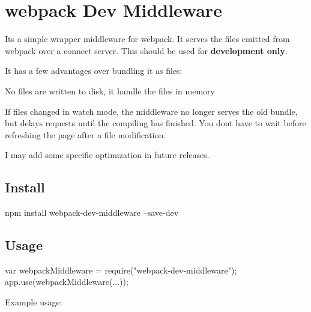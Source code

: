 \href{https://npmjs.com/package/webpack-dev-middleware}{\tt } \href{https://nodejs.org}{\tt } \href{https://david-dm.org/webpack/webpack-dev-middleware}{\tt } \href{https://travis-ci.org/webpack/webpack-dev-middleware}{\tt } \href{https://codecov.io/gh/webpack/webpack-dev-middleware}{\tt } \href{https://gitter.im/webpack/webpack}{\tt }

 \href{https://github.com/webpack/webpack}{\tt } \section*{webpack Dev Middleware}

 

It\textquotesingle{}s a simple wrapper middleware for webpack. It serves the files emitted from webpack over a connect server. This should be used for {\bfseries development only}.

It has a few advantages over bundling it as files\+:


\begin{DoxyItemize}
\item No files are written to disk, it handle the files in memory
\item If files changed in watch mode, the middleware no longer serves the old bundle, but delays requests until the compiling has finished. You don\textquotesingle{}t have to wait before refreshing the page after a file modification.
\item I may add some specific optimization in future releases.
\end{DoxyItemize}

\subsection*{Install}


\begin{DoxyCode}
npm install webpack-dev-middleware --save-dev
\end{DoxyCode}


\subsection*{Usage}


\begin{DoxyCode}
var webpackMiddleware = require("webpack-dev-middleware");
app.use(webpackMiddleware(...));
\end{DoxyCode}


Example usage\+:


